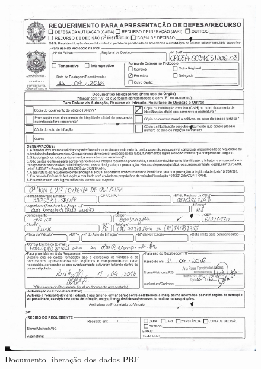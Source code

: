 \begin{figure}[ht!]
	\centering
		\caption{Documento liberação dos dados PRF}
		\includegraphics[scale=0.30]{Figuras/Anexos/A1-PRFDadospg_001.pdf}
		\qquad \quad \quad

\end{figure}
